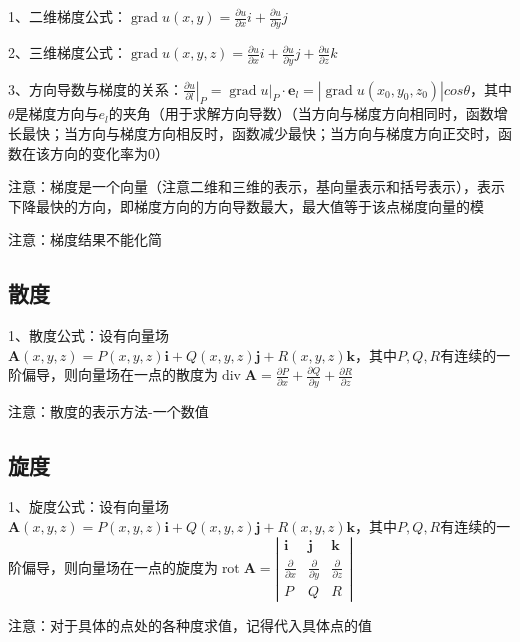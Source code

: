 1、二维梯度公式：$ \operatorname{grad} u(x, y)=\frac{\partial u}{\partial x} i+\frac{\partial u}{\partial y} j $

2、三维梯度公式：$ \operatorname{grad} u(x, y, z)=\frac{\partial u}{\partial x} i+\frac{\partial u}{\partial y} j+\frac{\partial u}{\partial z} k $

3、方向导数与梯度的关系：$ \left.\frac{\partial u}{\partial{l}}\right|_{P}=\left.\operatorname{grad} u\right|_{P} \cdot \boldsymbol{e}_{l}=|\operatorname{grad} u(x_0, y_0, z_0) |cos \theta $，其中$ \theta $是梯度方向与$ e_l $的夹角（用于求解方向导数）（当方向与梯度方向相同时，函数增长最快；当方向与梯度方向相反时，函数减少最快；当方向与梯度方向正交时，函数在该方向的变化率为0）

注意：梯度是一个向量（注意二维和三维的表示，基向量表示和括号表示），表示下降最快的方向，即梯度方向的方向导数最大，最大值等于该点梯度向量的模

注意：梯度结果不能化简



\subsection{散度}

1、散度公式：设有向量场$ \boldsymbol{A}(x, y, z)=P(x, y, z) \boldsymbol{i}+Q(x, y, z) \boldsymbol{j}+R(x, y, z) \boldsymbol{k} $，其中$ P,Q,R $有连续的一阶偏导，则向量场在一点的散度为$ \operatorname{div} \boldsymbol{A}=\frac{\partial P}{\partial x}+\frac{\partial Q}{\partial y}+\frac{\partial R}{\partial z} $

注意：散度的表示方法-一个数值



\subsection{旋度}

1、旋度公式：设有向量场$ \boldsymbol{A}(x, y, z)=P(x, y, z) \boldsymbol{i}+Q(x, y, z) \boldsymbol{j}+R(x, y, z) \boldsymbol{k} $，其中$ P,Q,R $有连续的一阶偏导，则向量场在一点的旋度为$ \operatorname{rot} \boldsymbol{A}=\left|\begin{array}{ccc}\boldsymbol{i} & \boldsymbol{j} & \boldsymbol{k} \\\frac{\partial}{\partial x} & \frac{\partial}{\partial y} & \frac{\partial}{\partial z} \\P & Q & R\end{array}\right| $

注意：对于具体的点处的各种度求值，记得代入具体点的值

